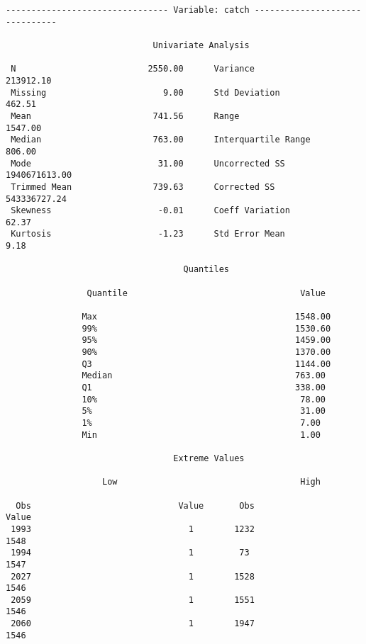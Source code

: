 \documentclass[
  12pt,
  a4paper,
  oneside]{book}
\begin{document}
\begin{verbatim}
-------------------------------- Variable: catch -------------------------------

                             Univariate Analysis                               

 N                          2550.00      Variance                 213912.10 
 Missing                       9.00      Std Deviation               462.51 
 Mean                        741.56      Range                      1547.00 
 Median                      763.00      Interquartile Range         806.00 
 Mode                         31.00      Uncorrected SS       1940671613.00 
 Trimmed Mean                739.63      Corrected SS          543336727.24 
 Skewness                     -0.01      Coeff Variation              62.37 
 Kurtosis                     -1.23      Std Error Mean                9.18 

                                   Quantiles                                    

                Quantile                                  Value                  

               Max                                       1548.00                 
               99%                                       1530.60                 
               95%                                       1459.00                 
               90%                                       1370.00                 
               Q3                                        1144.00                 
               Median                                    763.00                  
               Q1                                        338.00                  
               10%                                        78.00                  
               5%                                         31.00                  
               1%                                         7.00                   
               Min                                        1.00                   

                                 Extreme Values                                 

                   Low                                    High                   

  Obs                             Value       Obs                             Value 
 1993                               1        1232                             1548  
 1994                               1         73                              1547  
 2027                               1        1528                             1546  
 2059                               1        1551                             1546  
 2060                               1        1947                             1546  
\end{verbatim}
\end{document}
